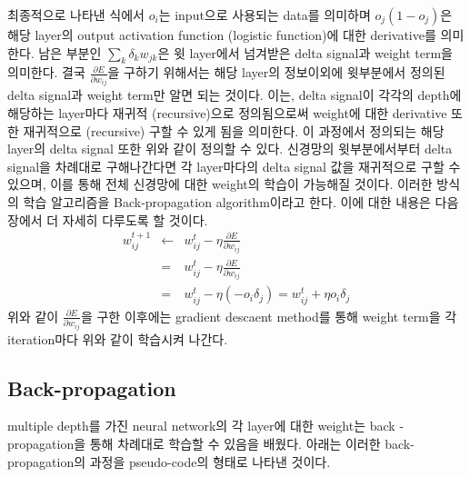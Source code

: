\documentclass[draft=false]{oblivoir}
\begin{document}
최종적으로 나타낸 식에서 $o_{i}$는 input으로 사용되는 data를 의미하며 $o_{j}(1-o_{j})$은 해당 layer의 output activation function  (logistic function)에 대한 derivative를 의미한다. 남은 부분인 $\sum_{k}\delta_{k}w_{jk}$은 윗 layer에서 넘겨받은 delta signal과 weight term을 의미한다. 결국 $\frac{\partial E}{\partial w_{ij}}$을 구하기 위해서는 해당 layer의 정보이외에 윗부분에서 정의된 delta signal과 weight term만 알면 되는 것이다. 이는, delta signal이 각각의 depth에 해당하는 layer마다 재귀적 (recursive)으로 정의됨으로써 weight에 대한 derivative 또한 재귀적으로 (recursive) 구할 수 있게 됨을 의미한다. 이 과정에서 정의되는 해당 layer의 delta signal 또한 위와 같이 정의할 수 있다. 신경망의 윗부분에서부터 delta signal을 차례대로 구해나간다면 각 layer마다의 delta signal 값을 재귀적으로 구할 수 있으며, 이를 통해 전체 신경망에 대한 weight의 학습이 가능해질 것이다. 이러한 방식의 학습 알고리즘을 Back-propagation algorithm이라고 한다. 이에 대한 내용은 다음 장에서 더 자세히 다루도록 할 것이다.
\begin{eqnarray}
w^{t+1}_{ij} & \leftarrow &  w^{t}_{ij} - \eta\frac{\partial E}{\partial w_{ij}}\\
& = & w^{t}_{ij} - \eta\frac{\partial E}{\partial w_{ij}}\\
& = & w^{t}_{ij} - \eta(-o_{i}\delta_{j}) = w^{t}_{ij} + \eta o_{i}\delta_{j}
\end{eqnarray}
위와 같이 $\frac{\partial E}{\partial w_{ij}}$을 구한 이후에는 gradient descaent method를 통해 weight term을 각 iteration마다 위와 같이 학습시켜 나간다. 

\subsection{Back-propagation}
multiple depth를 가진 neural network의 각 layer에 대한 weight는 back -propagation을 통해 차례대로 학습할 수 있음을 배웠다. 아래는 이러한 back-propagation의 과정을 pseudo-code의 형태로 나타낸 것이다. \\
\end{document}
